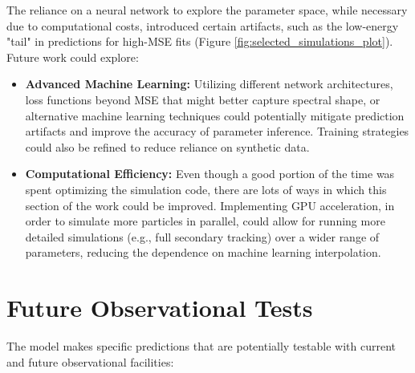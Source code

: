 The reliance on a neural network to explore the parameter space, while necessary due to computational costs, introduced certain artifacts, such as the low-energy "tail" in predictions for high-MSE fits (Figure \ref{fig:selected_simulations_plot}). Future work could explore:

\begin{itemize}
    \item \textbf{Advanced Machine Learning:} Utilizing different network architectures, loss functions beyond MSE that might better capture spectral shape, or alternative machine learning techniques could potentially mitigate prediction artifacts and improve the accuracy of parameter inference. Training strategies could also be refined to reduce reliance on synthetic data.
    \item \textbf{Computational Efficiency:} Even though a good portion of the time was spent optimizing the simulation code, there are lots of ways in which this section of the work could be improved. Implementing GPU acceleration, in order to simulate more particles in parallel, could allow for running more detailed simulations (e.g., full secondary tracking) over a wider range of parameters, reducing the dependence on machine learning interpolation.
\end{itemize}

\section{Future Observational Tests}

The model makes specific predictions that are potentially testable with current and future observational facilities:

